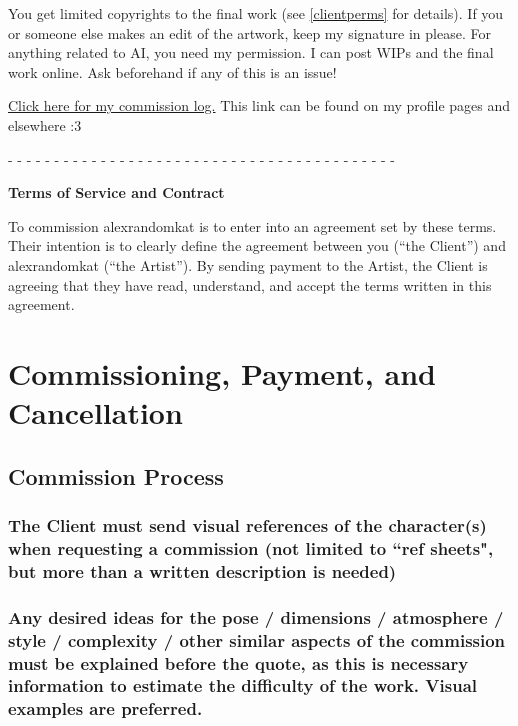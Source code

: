 \documentclass{article}
\newcommand{\hcm}[1][1]{\hspace{#1 cm}}
\newcommand{\subs}[2][]{\subsubsection[#1]{\normalfont #2}}
\begin{document}
\begin{flushleft}
\begin{center}
{		You get limited copyrights to the final work (see \ref{clientperms} for details). If you or someone else makes an edit of the artwork, keep my signature in please. For anything related to AI, you need my permission. I can post WIPs and the final work online. Ask beforehand if any of this is an issue!\\\hcm

		\href{https://github.com/AlexRandomkat/alexrandomkatCommLog/blob/main/alexrandomkat-commlog-PUBLIC.pdf}{Click here for my commission log.} This link can be found on my profile pages and elsewhere :3\\\hcm
		
		\begin{center}
			- - - - - - - - - - - - - - - - - - - - - - - - - - - - - - - - - - - - - - - - - -
		\end{center}
	}
\end{center}
\newpage

\begin{center}
	\parbox{14cm}{
		\begin{center}
			\textbf{\Large Terms of Service and Contract}\\\hcm
			
			To commission alexrandomkat is to enter into an agreement set by these terms. Their intention is to clearly define the agreement  between you (``the Client'') and alexrandomkat (``the Artist''). By sending payment to the Artist, the Client is agreeing that they have read, understand, and accept the terms written in this agreement.\\\hcm
		\end{center}
	}
\end{center}
\tableofcontents
\newpage

\section{Commissioning, Payment, and Cancellation}
\leftskip=1cm
	\subsection{Commission Process}
	\leftskip=2cm
		
 		\subs[Character Description]{The Client must send visual references of the character(s) when requesting a commission (not limited to ``ref sheets", but more than a written description is needed)}

		\subs[Work Description]{Any desired ideas for the pose / dimensions / atmosphere / style / complexity / other similar aspects of the commission must be explained before the quote, as this is necessary information to estimate the difficulty of the work. Visual examples are preferred.}\label{workdesc}
		

\end{flushleft}
\end{document}

